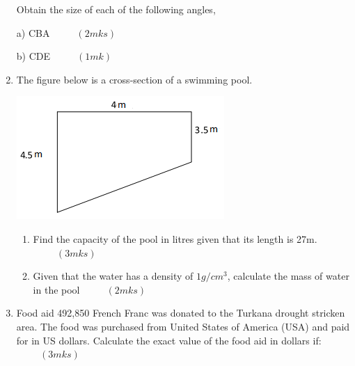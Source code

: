 \documentclass[
  a4paperpaper,
]{scrbook}
\begin{document}
\begin{tcolorbox}
\begin{enumerate}
  Obtain the size of each of the following angles,

  a) CBA \(\hspace{1cm} (2mks)\)

  b) CDE \(\hspace{1cm} (1mk)\)
\item
  The figure below is a cross-section of a swimming pool.

  \includegraphics{figures/fig2.png}

  \begin{enumerate}
  \def\labelenumii{\alph{enumii})}
  \item
    Find the capacity of the pool in litres given that its length is
    27m. \(\hspace{1cm} (3mks)\)
  \item
    Given that the water has a density of \(1g/cm^3\), calculate the
    mass of water in the pool \(\hspace{1cm} (2mks)\)
  \end{enumerate}
\item
  Food aid 492,850 French Franc was donated to the Turkana drought
  stricken area. The food was purchased from United States of America
  (USA) and paid for in US dollars. Calculate the exact value of the
  food aid in dollars if: \(\hspace{1cm} (3mks)\)


\end{enumerate}
\end{tcolorbox}
\end{document}
